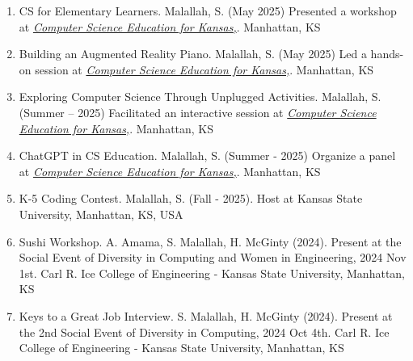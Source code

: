\documentclass[11pt]{article}
\begin{document}
\begin{enumerate}
\item CS for Elementary Learners. Malallah, S. (May 2025) Presented a workshop at \textit{\href{https://alt.cs.ksu.edu/cs4ks/}{Computer Science Education for Kansas,}}. Manhattan, KS {\href{https://alt.cs.ksu.edu/cs4ks/files/cs4ks2025/CS4KS_2025_Schedule.pdf}{\color{icnclr} \faGlobe[regular] }}

\item Building an Augmented Reality Piano. Malallah, S. (May 2025) Led a hands-on session at \textit{\href{https://alt.cs.ksu.edu/cs4ks/}{Computer Science Education for Kansas,}}. Manhattan, KS {\href{https://alt.cs.ksu.edu/cs4ks/files/cs4ks2025/CS4KS_2025_Schedule.pdf}{\color{icnclr} \faGlobe[regular] }}

\item Exploring Computer Science Through Unplugged Activities. Malallah, S. (Summer – 2025) Facilitated an interactive session at \textit{\href{https://alt.cs.ksu.edu/cs4ks/}{Computer Science Education for Kansas,}}. Manhattan, KS {\href{https://alt.cs.ksu.edu/cs4ks/files/cs4ks2025/CS4KS_2025_Schedule.pdf}{\color{icnclr} \faGlobe[regular] }}


\item  ChatGPT in CS Education. Malallah, S. (Summer - 2025) Organize a panel at \textit{ \href{https://alt.cs.ksu.edu/cs4ks/}{Computer Science Education for Kansas,}}. Manhattan, KS {\href{https://alt.cs.ksu.edu/cs4ks/files/cs4ks2025/CS4KS_2025_Schedule.pdf}{\color{icnclr} \faGlobe[regular] }} 

\item K-5 Coding Contest. Malallah, S. (Fall - 2025). Host at  Kansas State University, Manhattan, KS, USA {\href{https://people.cs.ksu.edu/~safia/AnnoKIDS/k5Contest.html}{\color{icnclr} \faGlobe[regular] }} 


\item Sushi Workshop. A. Amama, S. Malallah, H. McGinty (2024). Present at the Social Event of Diversity in Computing and Women in Engineering, 2024 Nov 1st. Carl R. Ice College of Engineering - Kansas State University, Manhattan, KS {\href{https://www.linkedin.com/posts/safiamalallah_womeninstem-womeninengineers-diversityincomputing-activity-7258414173519249408-fLgx?utm_source=share&utm_medium=member_desktop}{\color{icnclr} \faGlobe[regular] }}


\item Keys to a Great Job Interview. S. Malallah, H. McGinty (2024). Present at the 2nd Social Event of Diversity in Computing, 2024 Oct 4th. Carl R. Ice College of Engineering - Kansas State University, Manhattan, KS {\href{https://www.linkedin.com/posts/safiamalallah_diversityintech-womenindatascience-wids-activity-7248430448274522114-rPlE?utm_source=share&utm_medium=member_desktop}{\color{icnclr} \faGlobe[regular] }}


\end{enumerate}
\end{document}

